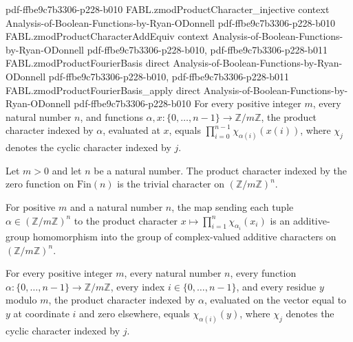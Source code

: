 \begin{theorem}
  {pdf-ffbe9c7b3306-p228-b010}
\proofstep
  {FABL.zmodProductCharacter_injective}
  {context}
  {Analysis-of-Boolean-Functions-by-Ryan-ODonnell}
  {pdf-ffbe9c7b3306-p228-b010}
\proofstep
  {FABL.zmodProductCharacterAddEquiv}
  {context}
  {Analysis-of-Boolean-Functions-by-Ryan-ODonnell}
  {pdf-ffbe9c7b3306-p228-b010,
    pdf-ffbe9c7b3306-p228-b011}
\proofstep
  {FABL.zmodProductFourierBasis}
  {direct}
  {Analysis-of-Boolean-Functions-by-Ryan-ODonnell}
  {pdf-ffbe9c7b3306-p228-b010,
    pdf-ffbe9c7b3306-p228-b011}
\proofstep
  {FABL.zmodProductFourierBasis_apply}
  {direct}
  {Analysis-of-Boolean-Functions-by-Ryan-ODonnell}
  {pdf-ffbe9c7b3306-p228-b010}
For every positive integer $m$, every natural number $n$, and functions
$\alpha,x:\{0,\ldots,n-1\}\to\mathbb Z/m\mathbb Z$, the product character indexed by
$\alpha$, evaluated at $x$, equals $\prod_{i=0}^{n-1}\chi_{\alpha(i)}(x(i))$, where
$\chi_j$ denotes the cyclic character indexed by $j$.
\end{theorem}

\begin{theorem}
\label{FABL.zmodProductCharacter_zero}
\leanok
{}
Let $m>0$ and let $n$ be a natural number. The product character indexed by the zero
function on $\mathrm{Fin}(n)$ is the trivial character on $(\mathbb Z/m\mathbb Z)^n$.
\end{theorem}

\begin{definition}
\label{FABL.zmodProductCharacterHom}
\leanok
{}
For positive $m$ and a natural number $n$, the map sending each tuple
$\alpha\in(\mathbb{Z}/m\mathbb{Z})^n$ to the product character
$x\mapsto\prod_{i=1}^n\chi_{\alpha_i}(x_i)$ is an additive-group homomorphism into the
group of complex-valued additive characters on $(\mathbb{Z}/m\mathbb{Z})^n$.
\end{definition}

\begin{theorem}
\label{FABL.zmodProductCharacter_apply_single}
\leanok
{}
For every positive integer $m$, every natural number $n$, every function
$\alpha:\{0,\ldots,n-1\}\to\mathbb Z/m\mathbb Z$, every index $i\in\{0,\ldots,n-1\}$,
and every residue $y$ modulo $m$, the product character indexed by $\alpha$, evaluated
on the vector equal to $y$ at coordinate $i$ and zero elsewhere, equals
$\chi_{\alpha(i)}(y)$, where $\chi_j$ denotes the cyclic character indexed by $j$.
\end{theorem}

